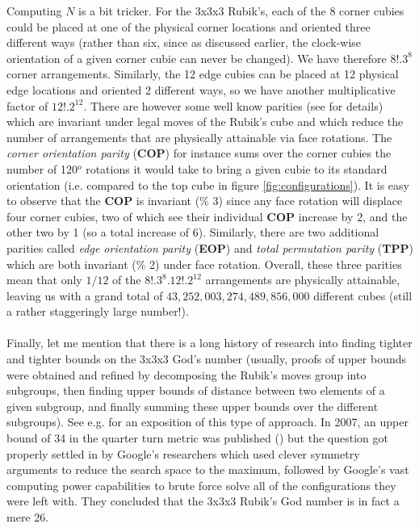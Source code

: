 Computing $N$ is a bit tricker. For the 3x3x3 Rubik's, each of the 8 corner cubies could be placed at one of the physical corner locations and oriented three different ways (rather than six, since as discussed earlier, the clock-wise orientation of a given corner cubie can never be changed). We have therefore $8! . 3^{8}$ corner arrangements. Similarly, the 12 edge cubies can be placed at 12 physical edge locations and oriented 2 different ways, so we have another multiplicative factor of $12! . 2^{12}$. There are however some well know parities (see \cite{Schoenert} for details) which are invariant under legal moves of the Rubik's cube and which reduce the number of arrangements that are physically attainable via face rotations. The \textit{corner orientation parity} (\textbf{COP}) for instance sums over the corner cubies the number of 120$^{o}$ rotations it would take to bring a given cubie to its standard orientation (i.e. compared to the top cube in figure \ref{fig:configurations}). It is easy to observe that the \textbf{COP} is invariant (\% 3) since any face rotation will displace four corner cubies, two of which see their individual \textbf{COP} increase by 2, and the other two by 1 (so a total increase of 6). Similarly, there are two additional parities called \textit{edge orientation parity} (\textbf{EOP}) and \textit{total permutation parity} (\textbf{TPP}) which are both invariant (\% 2) under face rotation. Overall, these three parities mean that only $1/12$ of the $8! . 3^{8} . 12! . 2^{12}$ arrangements are physically attainable, leaving us with a grand total of $43,252,003,274,489,856,000$ different cubes (still a rather staggeringly large number!).
\\
\\
Finally, let me mention that there is a long history of research into finding tighter and tighter bounds on the 3x3x3 God's number (usually, proofs of upper bounds were obtained and refined by decomposing the Rubik's moves group into subgroups, then finding upper bounds of distance between two elements of a given subgroup, and finally summing these upper bounds over the different subgroups). See e.g. \cite{RubiksChicago} for an exposition of this type of approach. In 2007, an upper bound of 34 in the quarter turn metric was published (\cite{RubiksRadu}) but the question got properly settled in \cite{RubiksGodNumber} by Google's researchers which used clever symmetry arguments to reduce the search space to the maximum, followed by Google's vast computing power capabilities to brute force solve all of the configurations they were left with. They concluded that the 3x3x3 Rubik's God number is in fact a mere 26.


